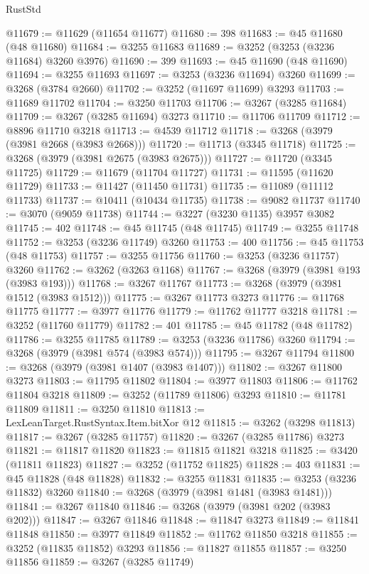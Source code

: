 \begin{lexlean}{RustStd}
\begin{coremodule}
@11679 := @11629 (@11654 @11677)
@11680 := 398
@11683 := @45 @11680 (@48 @11680)
@11684 := @3255 @11683
@11689 := @3252 (@3253 (@3236 @11684) @3260 @3976)
@11690 := 399
@11693 := @45 @11690 (@48 @11690)
@11694 := @3255 @11693
@11697 := @3253 (@3236 @11694) @3260
@11699 := @3268 (@3784 @2660)
@11702 := @3252 (@11697 @11699) @3293
@11703 := @11689 @11702
@11704 := @3250 @11703
@11706 := @3267 (@3285 @11684)
@11709 := @3267 (@3285 @11694) @3273
@11710 := @11706 @11709
@11712 := @8896 @11710 @3218
@11713 := @4539 @11712
@11718 := @3268 (@3979 (@3981 @2668 (@3983 @2668)))
@11720 := @11713 (@3345 @11718)
@11725 := @3268 (@3979 (@3981 @2675 (@3983 @2675)))
@11727 := @11720 (@3345 @11725)
@11729 := @11679 (@11704 @11727)
@11731 := @11595 (@11620 @11729)
@11733 := @11427 (@11450 @11731)
@11735 := @11089 (@11112 @11733)
@11737 := @10411 (@10434 @11735)
@11738 := @9082 @11737
@11740 := @3070 (@9059 @11738)
@11744 := @3227 (@3230 @1135) @3957 @3082
@11745 := 402
@11748 := @45 @11745 (@48 @11745)
@11749 := @3255 @11748
@11752 := @3253 (@3236 @11749) @3260
@11753 := 400
@11756 := @45 @11753 (@48 @11753)
@11757 := @3255 @11756
@11760 := @3253 (@3236 @11757) @3260
@11762 := @3262 (@3263 @1168)
@11767 := @3268 (@3979 (@3981 @193 (@3983 @193)))
@11768 := @3267 @11767
@11773 := @3268 (@3979 (@3981 @1512 (@3983 @1512)))
@11775 := @3267 @11773 @3273
@11776 := @11768 @11775
@11777 := @3977 @11776
@11779 := @11762 @11777 @3218
@11781 := @3252 (@11760 @11779)
@11782 := 401
@11785 := @45 @11782 (@48 @11782)
@11786 := @3255 @11785
@11789 := @3253 (@3236 @11786) @3260
@11794 := @3268 (@3979 (@3981 @574 (@3983 @574)))
@11795 := @3267 @11794
@11800 := @3268 (@3979 (@3981 @1407 (@3983 @1407)))
@11802 := @3267 @11800 @3273
@11803 := @11795 @11802
@11804 := @3977 @11803
@11806 := @11762 @11804 @3218
@11809 := @3252 (@11789 @11806) @3293
@11810 := @11781 @11809
@11811 := @3250 @11810
@11813 := LexLeanTarget.RustSyntax.Item.bitXor @12
@11815 := @3262 (@3298 @11813)
@11817 := @3267 (@3285 @11757)
@11820 := @3267 (@3285 @11786) @3273
@11821 := @11817 @11820
@11823 := @11815 @11821 @3218
@11825 := @3420 (@11811 @11823)
@11827 := @3252 (@11752 @11825)
@11828 := 403
@11831 := @45 @11828 (@48 @11828)
@11832 := @3255 @11831
@11835 := @3253 (@3236 @11832) @3260
@11840 := @3268 (@3979 (@3981 @1481 (@3983 @1481)))
@11841 := @3267 @11840
@11846 := @3268 (@3979 (@3981 @202 (@3983 @202)))
@11847 := @3267 @11846
@11848 := @11847 @3273
@11849 := @11841 @11848
@11850 := @3977 @11849
@11852 := @11762 @11850 @3218
@11855 := @3252 (@11835 @11852) @3293
@11856 := @11827 @11855
@11857 := @3250 @11856
@11859 := @3267 (@3285 @11749)

\end{coremodule}
\end{lexlean}

